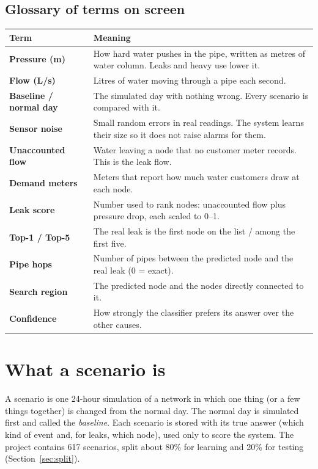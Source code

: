 \documentclass[11pt,a4paper]{article}
\begin{document}
\subsection{Glossary of terms on screen}
\begin{center}\small
\begin{tabularx}{\linewidth}{@{}>{\bfseries}p{3.1cm}Y@{}}
\toprule
Term & Meaning \\
\midrule
Pressure (m) & How hard water pushes in the pipe, written as metres of water column. Leaks and heavy use lower it. \\
Flow (L/s) & Litres of water moving through a pipe each second. \\
Baseline / normal day & The simulated day with nothing wrong. Every scenario is compared with it. \\
Sensor noise & Small random errors in real readings. The system learns their size so it does not raise alarms for them. \\
Unaccounted flow & Water leaving a node that no customer meter records. This is the leak flow. \\
Demand meters & Meters that report how much water customers draw at each node. \\
Leak score & Number used to rank nodes: unaccounted flow plus pressure drop, each scaled to 0--1. \\
Top-1 / Top-5 & The real leak is the first node on the list / among the first five. \\
Pipe hops & Number of pipes between the predicted node and the real leak (0 = exact). \\
Search region & The predicted node and the nodes directly connected to it. \\
Confidence & How strongly the classifier prefers its answer over the other causes. \\
\bottomrule
\end{tabularx}
\end{center}

\section{What a scenario is}
A scenario is one 24-hour simulation of a network in which one thing (or a few things together) is changed from the normal day. The normal day is simulated first and called the \emph{baseline}. Each scenario is stored with its true answer (which kind of event and, for leaks, which node), used only to score the system. The project contains 617 scenarios, split about 80\% for learning and 20\% for testing (Section~\ref{sec:split}).
\end{document}
